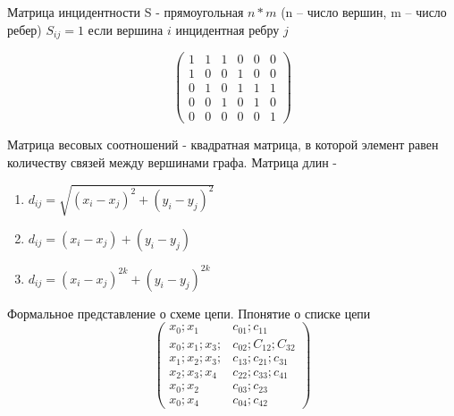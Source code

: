 \documentclass{article}
\begin{document}
Матрица инцидентности S - прямоугольная $n * m$ (n -- число вершин, m -- число ребер) $S_{ij} = 1$ если вершина $i$ инцидентная ребру $j$

$$
\begin{pmatrix}
1 & 1 & 1 & 0 & 0 & 0\\
1 & 0 & 0 & 1 & 0 & 0\\
0 & 1 & 0 & 1 & 1 & 1\\
0 & 0& 1 & 0 & 1 & 0\\
0 & 0 & 0 & 0 & 0 & 1
\end{pmatrix}
$$

Матрица весовых соотношений - квадратная матрица, в которой элемент равен количеству связей между вершинами графа.
Матрица длин -
\begin{enumerate}
	\item $d_{ij} = \sqrt{(x_i - x_j) ^ 2 + (y_i - y_j)^2}$
	\item $d_{ij} = (x_i - x_j) + (y_i - y_j)$
	\item $d_{ij} = (x_i - x_j)^{2k} + (y_i - y_j)^{2k}$
\end{enumerate}
Формальное представление о схеме цепи. Ппонятие о списке цепи
$$
\begin{pmatrix}
	x_0;x_1 & c_{01}; c_{11}\\
	x_0;x_1;x_3; & c_{02}; C_{12}; C_{32}\\
	x_1;x_2;x_3; & c_{13}; c_{21}; c_{31}\\
	x_2;x_3;x_4 & c_{22}; c_{33}; c_{41}\\
	x_0;x_2 & c_{03}; c_{23}\\
	x_0;x_4 & c_{04}; c_{42}
\end{pmatrix}
$$
\end{document}
